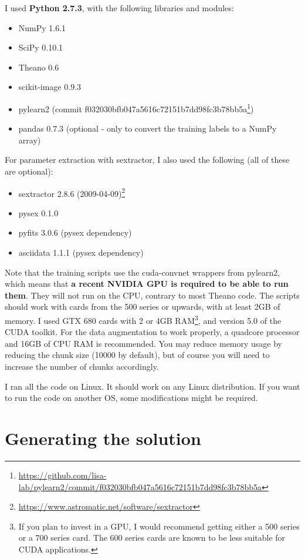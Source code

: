 \documentclass[a4paper,10pt]{article}
\begin{document}
I used \textbf{Python 2.7.3}, with the following libraries and modules:

\begin{itemize}
 \item NumPy 1.6.1
 \item SciPy 0.10.1
 \item Theano 0.6
 \item scikit-image 0.9.3
 \item pylearn2 (commit f032030bfb047a5616c72151b7dd98fc3b78bb5a\footnote{\url{https://github.com/lisa-lab/pylearn2/commit/f032030bfb047a5616c72151b7dd98fc3b78bb5a}})
 \item pandas 0.7.3 (optional - only to convert the training labels to a NumPy array)
\end{itemize}

For parameter extraction with sextractor, I also used the following (all of these are optional):
\begin{itemize}
 \item sextractor 2.8.6 (2009-04-09)\footnote{\url{https://www.astromatic.net/software/sextractor}}
 \item pysex 0.1.0
 \item pyfits 3.0.6 (pysex dependency)
 \item asciidata 1.1.1 (pysex dependency)
\end{itemize}

Note that the training scripts use the cuda-convnet wrappers from pylearn2, which means that \textbf{a recent NVIDIA GPU is required to be able to run them}. They will not run on the CPU, contrary to most Theano code. The scripts should work with cards from the 500 series or upwards, with at least 2GB of memory. I used GTX 680 cards with 2 or 4GB RAM\footnote{If you plan to invest in a GPU, I would recommend getting either a 500 series or a 700 series card. The 600 series cards are known to be less suitable for CUDA applications.}, and version 5.0 of the CUDA toolkit. For the data augmentation to work properly, a quadcore processor and 16GB of CPU RAM is recommended. You may reduce memory usage by reducing the chunk size (10000 by default), but of course you will need to increase the number of chunks accordingly.

I ran all the code on Linux. It should work on any Linux distribution. If you want to run the code on another OS, some modifications might be required.

\section{Generating the solution}
\label{sec:generating}
\end{document}
